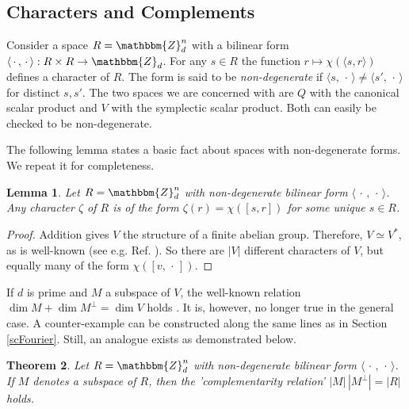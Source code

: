 \documentclass[aps,twocolumn,floatfix]{revtex4}
\newtheorem{theorem}{Theorem}
\newtheorem{lemma}[theorem]{Lemma}
\def\tuple#1.{\langle#1\rangle}
\def\ZZ{\mathbbm{Z}}
\def\spacedot{\,\cdot\,}
\begin{document}
\subsection{Characters and Complements}
\label{scCharacters}

Consider a space $R=\ZZ_d^n$ with a bilinear form $\tuple \spacedot,
\spacedot.: R\times R\to \ZZ_d$. For any $s\in R$ the function
$r\mapsto \chi(\tuple s, r.)$ defines a character of $R$. The form is said
to be \emph{non-degenerate} if $\tuple s, \spacedot. \neq \tuple
s',\spacedot.$ for distinct $s,s'$. The two spaces we are concerned with
are $Q$ with the canonical scalar product and $V$ with the symplectic
scalar product. Both can easily be checked to be non-degenerate.

The following lemma states a basic fact about spaces with non-degenerate
forms. We repeat it for completeness.

\begin{lemma}\label{lmCharacters}
	Let $R=\ZZ_d^n$ with non-degenerate bilinear form
	$\tuple\spacedot,\spacedot.$.
	Any character $\zeta$ of $R$ is of the form $\zeta(r)=\chi([s,r])$
	for some unique $s\in R$.
\end{lemma}

\begin{proof}
	Addition gives $V$ the structure of a finite abelian group.
	Therefore, $V\simeq V^*$, as is well-known (see e.g. Ref.
	\cite{harmonictextbook}). So there are $|V|$ different
	characters of $V$, but equally many of the form $\chi([v,\spacedot])$.
\end{proof}

If $d$ is prime and $M$ a subspace of $V$, the well-known relation
$\dim M+\dim M^\bot = \dim V$ holds \cite{huppert}. It is, however, no
longer true in the general case. A counter-example can be constructed
along the same lines as in Section \ref{scFourier}. Still, an analogue
exists as demonstrated below.

\begin{theorem}\label{thComplements}
	Let $R=\ZZ_d^n$ with non-degenerate bilinear form
	$\tuple\spacedot,\spacedot.$. If $M$ denotes a subspace of $R$, then the 
	'complementarity relation' $|M|\,|M^\bot|=|R|$ holds. 
\end{theorem}
\end{document}
